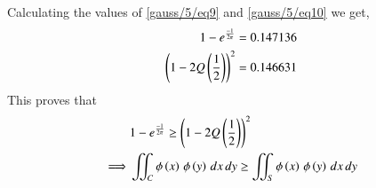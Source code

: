     Calculating the values of \eqref{gauss/5/eq9} and \eqref{gauss/5/eq10} we get,
    \begin{align}
        1 - e^{\frac{-1}{2\pi}} &= 0.147136\\
        \left(1-2Q\left(\frac{1}{2}\right)\right)^2 &= 0.146631
    \end{align}
    This proves that 
    \begin{align}
        &1 - e^{\frac{-1}{2\pi}} \geq \left(1-2Q\left(\frac{1}{2}\right)\right)^2\\
        \implies  &\iint_C{\phi\left(x\right)\,\phi\left(y\right)\,dx\,dy} \geq \iint_S{\phi\left(x\right)\,\phi\left(y\right)\,dx\,dy}
    \end{align}
    